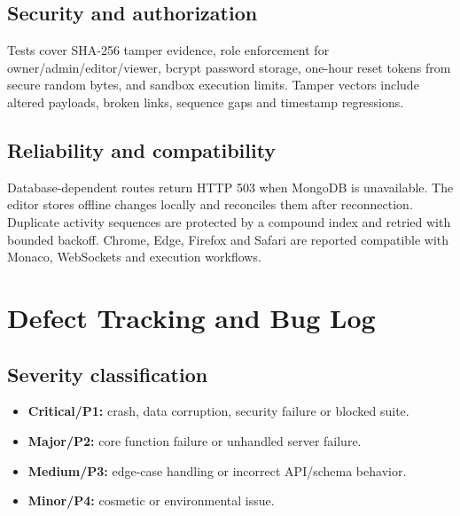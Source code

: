 \documentclass[11pt,a4paper]{article}
\begin{document}
\subsection{Security and authorization}
Tests cover SHA-256 tamper evidence, role enforcement for owner/admin/editor/viewer,
bcrypt password storage, one-hour reset tokens from secure random bytes, and
sandbox execution limits. Tamper vectors include altered payloads, broken links,
sequence gaps and timestamp regressions.

\subsection{Reliability and compatibility}
Database-dependent routes return HTTP 503 when MongoDB is unavailable. The editor
stores offline changes locally and reconciles them after reconnection. Duplicate
activity sequences are protected by a compound index and retried with bounded
backoff. Chrome, Edge, Firefox and Safari are reported compatible with Monaco,
WebSockets and execution workflows.

\section{Defect Tracking and Bug Log}

\subsection{Severity classification}
\begin{itemize}
    \item \textbf{Critical/P1:} crash, data corruption, security failure or blocked suite.
    \item \textbf{Major/P2:} core function failure or unhandled server failure.
    \item \textbf{Medium/P3:} edge-case handling or incorrect API/schema behavior.
    \item \textbf{Minor/P4:} cosmetic or environmental issue.
\end{itemize}
\end{document}
